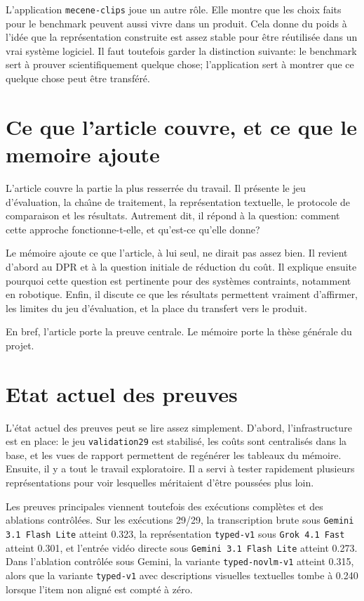 L'application \texttt{mecene-clips} joue un autre r\^ole. Elle montre que les choix faits pour le benchmark peuvent aussi vivre dans un produit. Cela donne du poids \`a l'id\'ee que la repr\'esentation construite est assez stable pour \^etre r\'eutilis\'ee dans un vrai syst\`eme logiciel. Il faut toutefois garder la distinction suivante: le benchmark sert \`a prouver scientifiquement quelque chose; l'application sert \`a montrer que ce quelque chose peut \^etre transf\'er\'e.

\section{Ce que l'article couvre, et ce que le memoire ajoute}

L'article couvre la partie la plus resserr\'ee du travail. Il pr\'esente le jeu d'\'evaluation, la cha\^\i ne de traitement, la repr\'esentation textuelle, le protocole de comparaison et les r\'esultats. Autrement dit, il r\'epond \`a la question: comment cette approche fonctionne-t-elle, et qu'est-ce qu'elle donne?

Le m\'emoire ajoute ce que l'article, \`a lui seul, ne dirait pas assez bien. Il revient d'abord au DPR et \`a la question initiale de r\'eduction du co\^ut. Il explique ensuite pourquoi cette question est pertinente pour des syst\`emes contraints, notamment en robotique. Enfin, il discute ce que les r\'esultats permettent vraiment d'affirmer, les limites du jeu d'\'evaluation, et la place du transfert vers le produit.

En bref, l'article porte la preuve centrale. Le m\'emoire porte la th\`ese g\'en\'erale du projet.

\section{Etat actuel des preuves}

L'\'etat actuel des preuves peut se lire assez simplement. D'abord, l'infrastructure est en place: le jeu \texttt{validation29} est stabilis\'e, les co\^uts sont centralis\'es dans la base, et les vues de rapport permettent de reg\'en\'erer les tableaux du m\'emoire. Ensuite, il y a tout le travail exploratoire. Il a servi \`a tester rapidement plusieurs repr\'esentations pour voir lesquelles m\'eritaient d'\^etre pouss\'ees plus loin.

Les preuves principales viennent toutefois des ex\'ecutions compl\`etes et des ablations contr\^ol\'ees. Sur les ex\'ecutions 29/29, la transcription brute sous \texttt{Gemini 3.1 Flash Lite} atteint 0.323, la repr\'esentation \texttt{typed-v1} sous \texttt{Grok 4.1 Fast} atteint 0.301, et l'entr\'ee vid\'eo directe sous \texttt{Gemini 3.1 Flash Lite} atteint 0.273. Dans l'ablation contr\^ol\'ee sous Gemini, la variante \texttt{typed-novlm-v1} atteint 0.315, alors que la variante \texttt{typed-v1} avec descriptions visuelles textuelles tombe \`a 0.240 lorsque l'item non align\'e est compt\'e \`a z\'ero.

